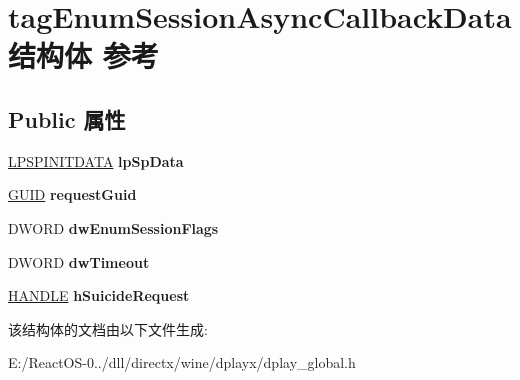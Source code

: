 \hypertarget{structtag_enum_session_async_callback_data}{}\section{tag\+Enum\+Session\+Async\+Callback\+Data结构体 参考}
\label{structtag_enum_session_async_callback_data}
\subsection*{Public 属性}
\begin{DoxyCompactItemize}
\item 
\mbox{\label{structtag_enum_session_async_callback_data_a13e01cacfd5028bc74826d2f0865fb9c}} 
\hyperlink{structtag_s_p_i_n_i_t_d_a_t_a}{L\+P\+S\+P\+I\+N\+I\+T\+D\+A\+TA} {\bfseries lp\+Sp\+Data}
\item 
\mbox{\label{structtag_enum_session_async_callback_data_ab29b4619c2d9770cb40e0d9f23ec9216}} 
\hyperlink{interface_g_u_i_d}{G\+U\+ID} {\bfseries request\+Guid}
\item 
\mbox{\label{structtag_enum_session_async_callback_data_ae1977d40b72e80fe055688db502fa9de}} 
D\+W\+O\+RD {\bfseries dw\+Enum\+Session\+Flags}
\item 
\mbox{\label{structtag_enum_session_async_callback_data_a7e7370717ce18a22b8cef7c9dbe9ba24}} 
D\+W\+O\+RD {\bfseries dw\+Timeout}
\item 
\mbox{\label{structtag_enum_session_async_callback_data_a1b7989e13ccfdfbfe7aa7a51dd9cee79}} 
\hyperlink{interfacevoid}{H\+A\+N\+D\+LE} {\bfseries h\+Suicide\+Request}
\end{DoxyCompactItemize}


该结构体的文档由以下文件生成\+:\begin{DoxyCompactItemize}
\item 
E\+:/\+React\+O\+S-\/0../dll/directx/wine/dplayx/dplay\+\_\+global.\+h\end{DoxyCompactItemize}
